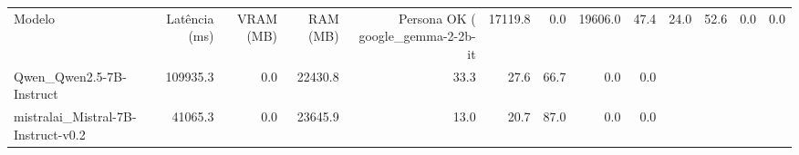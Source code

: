 \begin{tabular}{lrrrrrrrr}
\toprule
Modelo & Latência (ms) & VRAM (MB) & RAM (MB) & Persona OK (%
\midrule
google_gemma-2-2b-it & 17119.8 & 0.0 & 19606.0 & 47.4 & 24.0 & 52.6 & 0.0 & 0.0 \\
Qwen_Qwen2.5-7B-Instruct & 109935.3 & 0.0 & 22430.8 & 33.3 & 27.6 & 66.7 & 0.0 & 0.0 \\
mistralai_Mistral-7B-Instruct-v0.2 & 41065.3 & 0.0 & 23645.9 & 13.0 & 20.7 & 87.0 & 0.0 & 0.0 \\
\bottomrule
\end{tabular}
